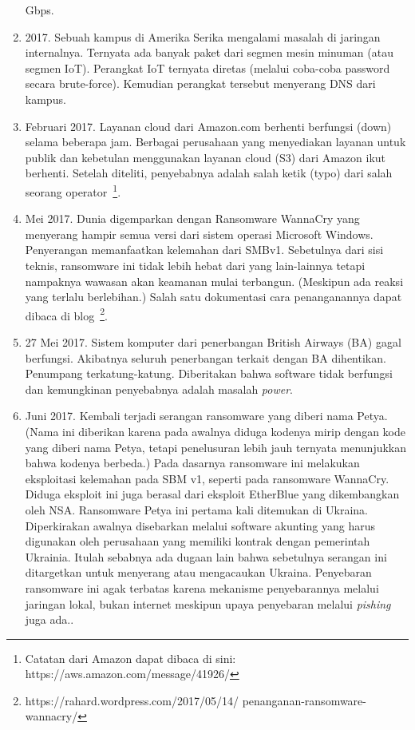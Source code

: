 \begin{enumerate}
   Gbps.
\item 2017.
   Sebuah kampus di Amerika Serika mengalami masalah di jaringan internalnya.
      Ternyata ada banyak paket dari segmen mesin minuman (atau segmen IoT).
      Perangkat IoT ternyata diretas (melalui coba-coba password secara
      brute-force). Kemudian perangkat tersebut menyerang DNS dari kampus.
\item Februari 2017. 
   Layanan cloud dari Amazon.com berhenti berfungsi (down) selama beberapa jam.
      Berbagai perusahaan yang menyediakan layanan untuk publik dan kebetulan
      menggunakan layanan cloud (S3) dari Amazon ikut berhenti. Setelah
      diteliti, penyebabnya adalah salah ketik (typo) dari salah seorang
      operator~\footnote{Catatan dari Amazon dapat dibaca di sini: https://aws.amazon.com/message/41926/}.
   \item Mei 2017. Dunia digemparkan dengan Ransomware WannaCry yang menyerang
      hampir semua versi dari sistem operasi Microsoft Windows. Penyerangan
      memanfaatkan kelemahan dari SMBv1. Sebetulnya dari sisi teknis,
      ransomware ini tidak lebih hebat dari yang lain-lainnya tetapi nampaknya
      wawasan akan keamanan mulai terbangun. (Meskipun ada reaksi yang terlalu
      berlebihan.) Salah satu dokumentasi cara penanganannya dapat dibaca di
      blog~\cite{brwannacry}\footnote{https://rahard.wordpress.com/2017/05/14/
      penanganan-ransomware-wannacry/}.
\item 27 Mei 2017. Sistem komputer dari penerbangan British Airways (BA) gagal
   berfungsi. Akibatnya seluruh penerbangan terkait dengan BA dihentikan.
      Penumpang terkatung-katung. Diberitakan bahwa software tidak berfungsi
      dan kemungkinan penyebabnya adalah masalah {\em power}.
   \item Juni 2017. Kembali terjadi serangan ransomware yang diberi nama Petya.
      (Nama ini diberikan karena pada awalnya diduga kodenya mirip dengan kode
      yang diberi nama Petya, tetapi penelusuran lebih jauh ternyata
      menunjukkan bahwa kodenya berbeda.) Pada dasarnya ransomware ini
      melakukan eksploitasi kelemahan pada SBM v1, seperti pada ransomware
      WannaCry. Diduga eksploit ini juga berasal dari eksploit EtherBlue yang
      dikembangkan oleh NSA. Ransomware Petya ini pertama kali ditemukan di
      Ukraina. Diperkirakan awalnya disebarkan melalui software akunting yang
      harus digunakan oleh perusahaan yang memiliki kontrak dengan pemerintah
      Ukrainia. Itulah sebabnya ada dugaan lain bahwa sebetulnya serangan ini
      ditargetkan untuk menyerang atau mengacaukan Ukraina. Penyebaran
      ransomware ini agak terbatas karena mekanisme penyebarannya melalui
      jaringan lokal, bukan internet meskipun upaya penyebaran melalui 
      {\em pishing} juga ada..
\end{enumerate}

